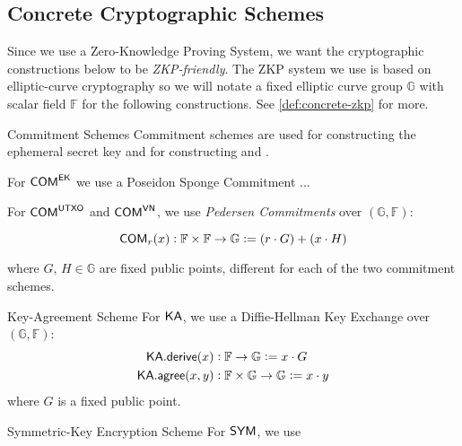 

\subsection{Concrete Cryptographic Schemes}

Since we use a Zero-Knowledge Proving System, we want the cryptographic constructions below to be \emph{ZKP-friendly}. The ZKP system we use is based on elliptic-curve cryptography so we will notate a fixed elliptic curve group $\mathbb{G}$ with scalar field $\mathbb{F}$ for the following constructions. See \autoref{def:concrete-zkp} for more.

\begin{definitiontoc}{Commitment Schemes}
    Commitment schemes are used for constructing the ephemeral secret key and for constructing  and .

    For ${\textsf{COM}}^{{\textsf{EK}}}$ we use a Poseidon Sponge Commitment ... 

    For ${\textsf{COM}}^{{\textsf{UTXO}}}$ and ${\textsf{COM}}^{{\textsf{VN}}}$, we use \emph{Pedersen Commitments} over $(\mathbb{G}, \mathbb{F})$:

    \[{\textsf{COM}}_r(x) : \mathbb{F} \times \mathbb{F} \to \mathbb{G} := (r \cdot G) + (x \cdot H)\]

    where $G,\,H \in \mathbb{G}$ are fixed public points, different for each of the two commitment schemes.
\end{definitiontoc}

\begin{definitiontoc}{Key-Agreement Scheme}
    For ${\textsf{KA}}$, we use a Diffie-Hellman Key Exchange over $(\mathbb{G}, \mathbb{F})$:
    \begin{align*}
        {\textsf{KA}}.{\textsf{derive}}(x)   &: \mathbb{F} \to \mathbb{G}                   := x \cdot G \\
        {\textsf{KA}}.{\textsf{agree}}(x, y) &: \mathbb{F} \times \mathbb{G} \to \mathbb{G} := x \cdot y
    \end{align*}
    where $G$ is a fixed public point.
\end{definitiontoc}

\begin{definitiontoc}{Symmetric-Key Encryption Scheme}
    For ${\textsf{SYM}}$, we use

\end{definitiontoc}


